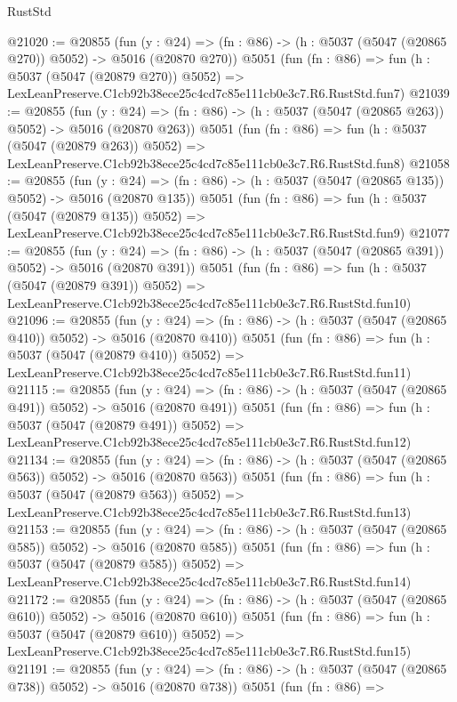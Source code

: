 \begin{lexlean}{RustStd}
\begin{coremodule}
@21020 := @20855
    (fun (y : @24) => (fn : @86) -> (h : @5037 (@5047 (@20865 @270)) @5052) -> @5016 (@20870 @270))
    @5051
    (fun (fn : @86) =>
    fun (h : @5037 (@5047 (@20879 @270)) @5052) =>
    LexLeanPreserve.C1cb92b38ece25c4cd7c85e111cb0e3c7.R6.RustStd.fun7)
@21039 := @20855
    (fun (y : @24) => (fn : @86) -> (h : @5037 (@5047 (@20865 @263)) @5052) -> @5016 (@20870 @263))
    @5051
    (fun (fn : @86) =>
    fun (h : @5037 (@5047 (@20879 @263)) @5052) =>
    LexLeanPreserve.C1cb92b38ece25c4cd7c85e111cb0e3c7.R6.RustStd.fun8)
@21058 := @20855
    (fun (y : @24) => (fn : @86) -> (h : @5037 (@5047 (@20865 @135)) @5052) -> @5016 (@20870 @135))
    @5051
    (fun (fn : @86) =>
    fun (h : @5037 (@5047 (@20879 @135)) @5052) =>
    LexLeanPreserve.C1cb92b38ece25c4cd7c85e111cb0e3c7.R6.RustStd.fun9)
@21077 := @20855
    (fun (y : @24) => (fn : @86) -> (h : @5037 (@5047 (@20865 @391)) @5052) -> @5016 (@20870 @391))
    @5051
    (fun (fn : @86) =>
    fun (h : @5037 (@5047 (@20879 @391)) @5052) =>
    LexLeanPreserve.C1cb92b38ece25c4cd7c85e111cb0e3c7.R6.RustStd.fun10)
@21096 := @20855
    (fun (y : @24) => (fn : @86) -> (h : @5037 (@5047 (@20865 @410)) @5052) -> @5016 (@20870 @410))
    @5051
    (fun (fn : @86) =>
    fun (h : @5037 (@5047 (@20879 @410)) @5052) =>
    LexLeanPreserve.C1cb92b38ece25c4cd7c85e111cb0e3c7.R6.RustStd.fun11)
@21115 := @20855
    (fun (y : @24) => (fn : @86) -> (h : @5037 (@5047 (@20865 @491)) @5052) -> @5016 (@20870 @491))
    @5051
    (fun (fn : @86) =>
    fun (h : @5037 (@5047 (@20879 @491)) @5052) =>
    LexLeanPreserve.C1cb92b38ece25c4cd7c85e111cb0e3c7.R6.RustStd.fun12)
@21134 := @20855
    (fun (y : @24) => (fn : @86) -> (h : @5037 (@5047 (@20865 @563)) @5052) -> @5016 (@20870 @563))
    @5051
    (fun (fn : @86) =>
    fun (h : @5037 (@5047 (@20879 @563)) @5052) =>
    LexLeanPreserve.C1cb92b38ece25c4cd7c85e111cb0e3c7.R6.RustStd.fun13)
@21153 := @20855
    (fun (y : @24) => (fn : @86) -> (h : @5037 (@5047 (@20865 @585)) @5052) -> @5016 (@20870 @585))
    @5051
    (fun (fn : @86) =>
    fun (h : @5037 (@5047 (@20879 @585)) @5052) =>
    LexLeanPreserve.C1cb92b38ece25c4cd7c85e111cb0e3c7.R6.RustStd.fun14)
@21172 := @20855
    (fun (y : @24) => (fn : @86) -> (h : @5037 (@5047 (@20865 @610)) @5052) -> @5016 (@20870 @610))
    @5051
    (fun (fn : @86) =>
    fun (h : @5037 (@5047 (@20879 @610)) @5052) =>
    LexLeanPreserve.C1cb92b38ece25c4cd7c85e111cb0e3c7.R6.RustStd.fun15)
@21191 := @20855
    (fun (y : @24) => (fn : @86) -> (h : @5037 (@5047 (@20865 @738)) @5052) -> @5016 (@20870 @738))
    @5051
    (fun (fn : @86) =>

\end{coremodule}
\end{lexlean}
